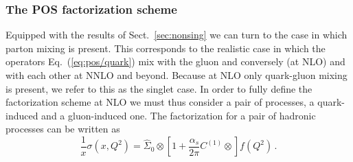 \subsubsection{The POS factorization scheme}
\label{sec:pos}

Equipped with the results of Sect.~\ref{sec:nonsing} we can  turn to
the case in which parton mixing is present.   This corresponds to the
realistic case in which the operators Eq.~(\ref{eq:pos/quark}) mix with
the gluon and conversely (at NLO) and with each other at NNLO and
beyond. Because at NLO only quark-gluon mixing is present, we refer to
this as the singlet case.
In order to fully define
the factorization scheme at NLO we must thus consider a pair of
processes, a quark-induced and a gluon-induced one.
The factorization for a pair of hadronic processes
can be written as 
\begin{equation}\label{eq:pos/singhadfact}
 \frac{1}{x} \sigma(x,Q^2)= \hat \Sigma_0\otimes \left[1
 +\frac{\alpha_s}{2\pi}  C^{(1)} \otimes \right] f(Q^2) \,.
 \end{equation}
